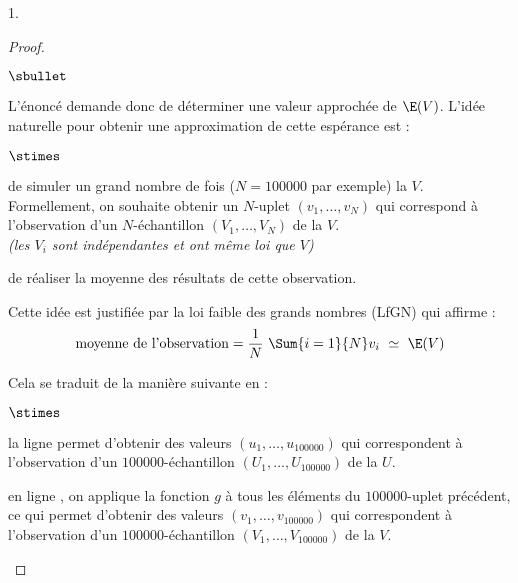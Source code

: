 \documentclass[11pt]{article}%
\begin{document}
\begin{noliste}{1.}
\begin{proof}
\begin{noliste}{$\sbullet$}
    \item L'énoncé demande donc de déterminer une valeur approchée de
      $\E(V)$. L'idée naturelle pour obtenir une approximation de
      cette espérance est :
      \begin{noliste}{$\stimes$}
      \item de simuler un grand nombre de fois ($N = 100 000$ par
        exemple) la \var $V$.\\
        Formellement, on souhaite obtenir un $N$-uplet $(v_1, \ldots,
        v_N)$ qui correspond à l'observation d'un $N$-échantillon
        $(V_1, \ldots, V_N)$ de la \var $V$.\\
        {\it (les \var $V_i$ sont indépendantes et ont même loi que
          $V$)}
      \item de réaliser la moyenne des résultats de cette observation.
      \end{noliste}
      Cette idée est justifiée par la loi faible des grands nombres
      (LfGN) qui affirme :
      \[
      \mbox{moyenne de l'observation} = \dfrac{1}{N} \ \Sum{i = 1}{N}
      v_i \ \simeq \ \E(V)
      \]

    \item Cela se traduit de la manière suivante en \Scilab{} :
      \begin{noliste}{$\stimes$}
      \item la ligne  permet d'obtenir des valeurs $(u_1,
        \ldots, u_{100 000})$ qui correspondent à l'observation d'un
        $100 000$-échantillon $(U_1, \ldots, U_{100 000})$ de la \var
        $U$.

      \item en ligne , on applique la fonction $g$ à tous les
        éléments du $100 000$-uplet précédent, ce qui permet d'obtenir
        des valeurs $(v_1, \ldots, v_{100 000})$ qui correspondent à
        l'observation d'un $100 000$-échantillon $(V_1, \ldots, V_{100
          000})$ de la \var $V$.


\end{noliste}
\end{noliste}
\end{proof}
\end{noliste}
\end{document}
